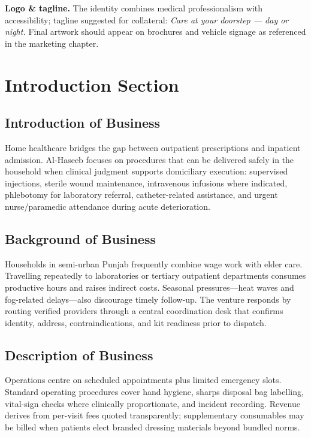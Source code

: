 \documentclass[12pt,a4paper]{report}
\begin{document}
\textbf{Logo \& tagline.} The identity combines medical professionalism with accessibility; tagline suggested for collateral: \textit{Care at your doorstep --- day or night.} Final artwork should appear on brochures and vehicle signage as referenced in the marketing chapter.

\tableofcontents

\cleardoublepage

\setcounter{page}{1}

\chapter{Introduction Section}

\section{Introduction of Business}
Home healthcare bridges the gap between outpatient prescriptions and inpatient admission. Al-Haseeb focuses on procedures that can be delivered safely in the household when clinical judgment supports domiciliary execution: supervised injections, sterile wound maintenance, intravenous infusions where indicated, phlebotomy for laboratory referral, catheter-related assistance, and urgent nurse/paramedic attendance during acute deterioration.

\section{Background of Business}
Households in semi-urban Punjab frequently combine wage work with elder care. Travelling repeatedly to laboratories or tertiary outpatient departments consumes productive hours and raises indirect costs. Seasonal pressures---heat waves and fog-related delays---also discourage timely follow-up. The venture responds by routing verified providers through a central coordination desk that confirms identity, address, contraindications, and kit readiness prior to dispatch.

\section{Description of Business}
Operations centre on scheduled appointments plus limited emergency slots. Standard operating procedures cover hand hygiene, sharps disposal bag labelling, vital-sign checks where clinically proportionate, and incident recording. Revenue derives from per-visit fees quoted transparently; supplementary consumables may be billed when patients elect branded dressing materials beyond bundled norms.
\end{document}
